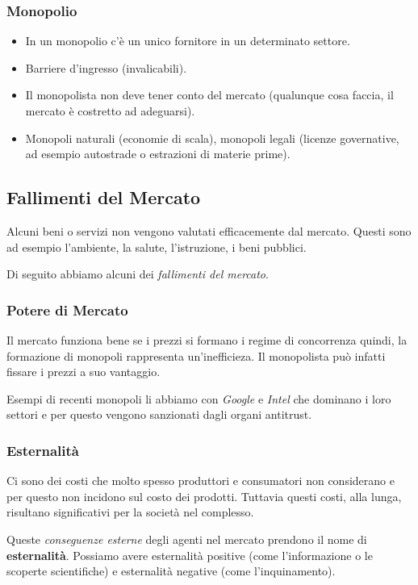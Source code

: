 \documentclass[a4paper,portrait,12pt]{article}
\theoremstyle{definition}
\begin{document}
\subsubsection{Monopolio}
\begin{itemize}
\item In un monopolio c'è un unico fornitore in un determinato settore.
\item Barriere d'ingresso (invalicabili).
\item Il monopolista non deve tener conto del mercato (qualunque cosa faccia, il mercato è costretto ad adeguarsi).
\item Monopoli naturali (economie di scala), monopoli legali (licenze governative, ad esempio autostrade o estrazioni di materie prime).
\end{itemize}

\subsection{Fallimenti del Mercato}

Alcuni beni o servizi non vengono valutati efficacemente dal mercato.
Questi sono ad esempio l'ambiente, la salute, l'istruzione, i beni pubblici.

Di seguito abbiamo alcuni dei \emph{fallimenti del mercato}.

\subsubsection{Potere di Mercato}
Il mercato funziona bene se i prezzi si formano i regime di concorrenza quindi, la formazione di monopoli rappresenta un'inefficieza.
Il monopolista può infatti fissare i prezzi a suo vantaggio.

Esempi di recenti monopoli li abbiamo con \emph{Google} e \emph{Intel} che dominano i loro settori e per questo vengono sanzionati dagli organi antitrust.

\subsubsection{Esternalità}
Ci sono dei costi che molto spesso produttori e consumatori non considerano e per questo non incidono sul costo dei prodotti.
Tuttavia questi costi, alla lunga, risultano significativi per la società nel complesso.

Queste \emph{conseguenze esterne} degli agenti nel mercato prendono il nome di \textbf{esternalità}.
Possiamo avere esternalità positive (come l'informazione o le scoperte scientifiche) e esternalità negative (come l'inquinamento).
\end{document}
